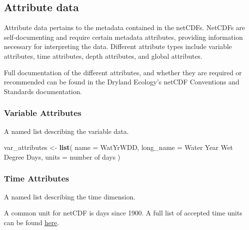 \documentclass[
]{article}
\newenvironment{Shaded}{\begin{snugshade}}{\end{snugshade}}
\newcommand{\DataTypeTok}[1]{\textcolor[rgb]{0.13,0.29,0.53}{#1}}
\newcommand{\KeywordTok}[1]{\textcolor[rgb]{0.13,0.29,0.53}{\textbf{#1}}}
\newcommand{\NormalTok}[1]{#1}
\newcommand{\StringTok}[1]{\textcolor[rgb]{0.31,0.60,0.02}{#1}}
\begin{document}
\hypertarget{attribute-data}{%
\subsection{Attribute data}\label{attribute-data}}

Attribute data pertains to the metadata contained in the netCDFs. NetCDFs are
self-documenting and require certain metadata attributes, providing information
necessary for interpreting the data. Different attribute types include variable attributes,
time attributes, depth attributes, and global attributes.

Full documentation of the different attributes, and whether they are required or
recommended can be found in the Dryland Ecology's netCDF Conventions and Standards
documentation.

\hypertarget{variable-attributes}{%
\subsubsection{Variable Attributes}\label{variable-attributes}}

A named list describing the variable data.

\begin{Shaded}
\begin{Highlighting}[]
\NormalTok{var\_attributes \textless{}{-}}\StringTok{ }\KeywordTok{list}\NormalTok{(}
  \DataTypeTok{name =} \StringTok{\textquotesingle{}WatYrWDD\textquotesingle{}}\NormalTok{,}
  \DataTypeTok{long\_name =} \StringTok{\textquotesingle{}Water Year Wet Degree Days\textquotesingle{}}\NormalTok{,}
  \DataTypeTok{units =} \StringTok{\textquotesingle{}number of days\textquotesingle{}}
\NormalTok{)}
\end{Highlighting}
\end{Shaded}

\hypertarget{time-attributes}{%
\subsubsection{Time Attributes}\label{time-attributes}}

A named list describing the time dimension.

A common unit for netCDF is days since 1900. A full list of accepted time units can
be found \href{https://ncics.org/portfolio/other-resources/udunits2/}{here}.
\end{document}

